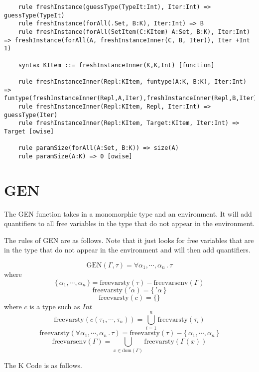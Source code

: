\begin{lstlisting}
    rule freshInstance(guessType(TypeIt:Int), Iter:Int) => guessType(TypeIt)
    rule freshInstance(forAll(.Set, B:K), Iter:Int) => B
    rule freshInstance(forAll(SetItem(C:KItem) A:Set, B:K), Iter:Int) => freshInstance(forAll(A, freshInstanceInner(C, B, Iter)), Iter +Int 1)

    syntax KItem ::= freshInstanceInner(K,K,Int) [function]

    rule freshInstanceInner(Repl:KItem, funtype(A:K, B:K), Iter:Int) => funtype(freshInstanceInner(Repl,A,Iter),freshInstanceInner(Repl,B,Iter))
    rule freshInstanceInner(Repl:KItem, Repl, Iter:Int) => guessType(Iter)
    rule freshInstanceInner(Repl:KItem, Target:KItem, Iter:Int) => Target [owise]

    rule paramSize(forAll(A:Set, B:K)) => size(A)
    rule paramSize(A:K) => 0 [owise]
\end{lstlisting}

\section{GEN}

The GEN function takes in a monomorphic type and an environment. It will add quantifiers to all free variables in the type that do not appear in the environment.

The rules of GEN are as follows. Note that it just looks for free variables that are in the type that do not appear in the environment and will then add quantifiers.

$$\text{GEN}(\Gamma,\tau) = \forall \alpha_1, \cdots, \alpha_n \, . \, \tau$$
where
$$\{ \, \alpha_1, \cdots, \alpha_n \, \} = \text{freevarsty}(\tau) - \text{freevarsenv}(\Gamma)$$
$$\text{freevarsty}('\alpha) = \{ \, '\alpha \, \}$$
$$\text{freevarsty}(c) = \{\}$$ where $c$ is a type such as $Int$
$$\text{freevarsty}(c(\tau_1, \cdots, \tau_n)) = \bigcup_{i = 1}^n \text{freevarsty}(\tau_i)$$
$$\text{freevarsty}(\forall \alpha_1, \cdots, \alpha_n \, . \, \tau) = \text{freevarsty}(\tau) - \{ \, \alpha_1, \cdots, \alpha_n \, \}$$
$$\text{freevarsenv}(\Gamma) = \bigcup_{x \in \text{dom}(\Gamma)}\text{freevarsty}(\Gamma(x))$$

The K Code is as follows.

